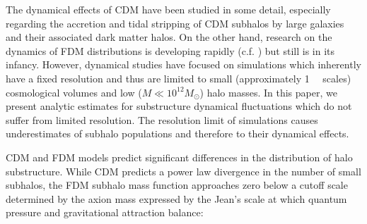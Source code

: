 \documentclass[usenatbib]{mnras}
\begin{document}
\par

The dynamical effects of CDM have been studied in some detail, especially regarding the accretion and tidal stripping of CDM subhalos by large galaxies and their associated dark matter halos. On the other hand, research on the dynamics of FDM distributions is developing rapidly (c.f. \cite{schive_solitons, Schrodinger-Poisson, Schive-virialized-wave-halos, relaxation}) but still is in its infancy. However, dynamical studies have focused on simulations which inherently have a fixed resolution and thus are limited to small (approximately \SI{1}{\mega \parsec} scales) cosmological volumes and low ($M \ll 10^{12} M_{\odot}$) halo masses. In this paper, we present analytic estimates for substructure dynamical fluctuations which do not suffer from limited resolution. The resolution limit of simulations causes underestimates of subhalo populations and therefore to their dynamical effects. 
\par 
	CDM and FDM models predict significant differences in the distribution of halo substructure. While CDM predicts a power law divergence in the number of small subhalos, the FDM subhalo mass function approaches zero below a cutoff scale determined by the axion mass expressed by the Jean’s scale at which quantum pressure and gravitational attraction balance:
\setlength{\belowdisplayskip}{4pt} \setlength{\belowdisplayshortskip}{4pt}
\setlength{\abovedisplayskip}{4pt} \setlength{\abovedisplayshortskip}{4pt}
\end{document}
